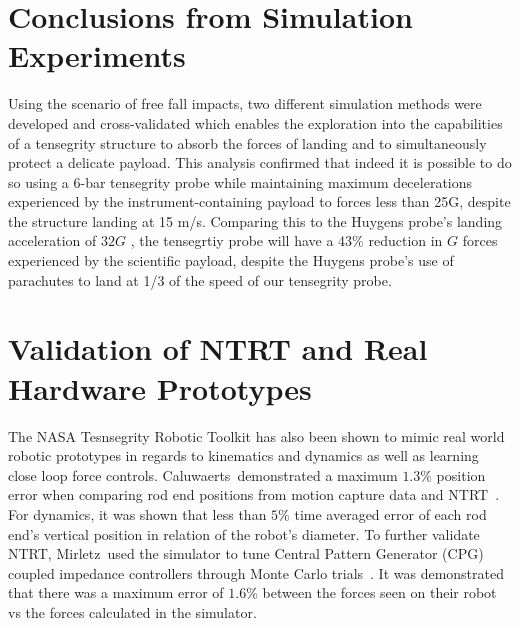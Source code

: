 \section{Conclusions from Simulation Experiments}
Using the scenario of free fall impacts, two different simulation methods were developed and cross-validated which enables the exploration into the capabilities of a tensegrity structure to absorb the forces of landing and to simultaneously protect a delicate payload.  This analysis confirmed that indeed it is possible to do so using a 6-bar tensegrity probe while maintaining maximum decelerations experienced by the instrument-containing payload to forces less than 25G, despite the structure landing at 15 m/s.   Comparing this to the Huygens probe's landing acceleration of \(32G\) \cite{lorenz1994huygens}, the tensegrtiy probe will have a \(43\% \) reduction in \(G\) forces experienced by the scientific payload, despite the Huygens probe's use of parachutes to land at 1/3 of the speed of our tensegrity probe.

\section{Validation of NTRT and Real Hardware Prototypes}
The NASA Tesnsegrity Robotic Toolkit has also been shown to mimic real world robotic prototypes in regards to kinematics and dynamics as well as learning close loop force controls.
Caluwaerts~\etal demonstrated a maximum \(1.3\%\) position error when comparing rod end positions from motion capture data and NTRT~\cite{caluwaerts2014design}. 
For dynamics, it was shown that less than \(5\%\) time averaged error of each rod end's vertical position in relation of the robot's diameter.
To further validate NTRT, Mirletz~\etal used the simulator to tune Central Pattern Generator (CPG) coupled impedance controllers through Monte Carlo trials~\cite{mirletz2015towards}. 
It was demonstrated that there was a maximum error of \(1.6\%\) between the forces seen on their robot vs the forces calculated in the simulator.

